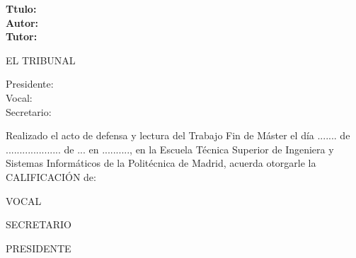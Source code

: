 \cleardoublepage

\begin{flushleft} \large
\textbf{Ttulo:} \TFM \\
\textbf{Autor:} \ME \\
\textbf{Tutor:} \TUTOR \\

\end{flushleft}

\hfill \break
\begin{center} \LARGE
EL TRIBUNAL \\ [1 cm]
\end{center}

\begin{flushleft} \LARGE
Presidente: \\ [1 cm]
Vocal: \\ [1 cm]
Secretario: \\ [1.5 cm]
\end{flushleft}

\large
Realizado el acto de defensa y lectura del Trabajo Fin de Máster el día
 ....... de ....................   de ... en .........., en la Escuela Técnica Superior
 de Ingeniera y Sistemas Informáticos de la Politécnica de Madrid, acuerda otorgarle la
 CALIFICACIÓN de: \\ [2 cm]

\begin{center}
 \large VOCAL \\ [2.2 cm]
\end{center}

\begin{minipage}{0.5\textwidth}
 \begin{flushleft}
 \large SECRETARIO
\end{flushleft}
\end{minipage}
\begin{minipage}{0.5\textwidth}
\begin{flushright}
 \large PRESIDENTE
\end{flushright}
\end{minipage}


